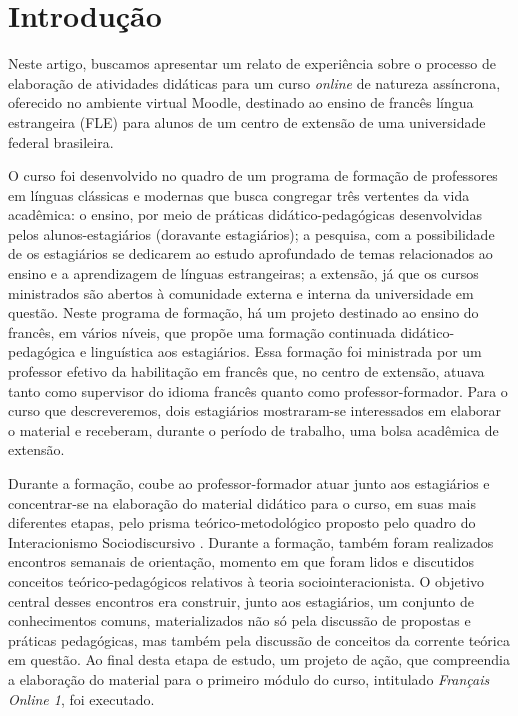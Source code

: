 \section{Introdução}\label{sec-introdução}

Neste artigo, buscamos apresentar um relato de experiência sobre o
processo de elaboração de atividades didáticas para um curso
\emph{online} de natureza assíncrona, oferecido no ambiente
virtual Moodle, destinado ao ensino de francês língua estrangeira (FLE)
para alunos de um centro de extensão de uma universidade federal
brasileira.

O curso foi desenvolvido no quadro de um programa de formação de
professores em línguas clássicas e modernas que busca congregar três
vertentes da vida acadêmica: o ensino, por meio de práticas
didático-pedagógicas desenvolvidas pelos alunos-estagiários (doravante
estagiários); a pesquisa, com a possibilidade de os estagiários se
dedicarem ao estudo aprofundado de temas relacionados ao ensino e a
aprendizagem de línguas estrangeiras; a extensão, já que os cursos
ministrados são abertos à comunidade externa e interna da universidade
em questão. Neste programa de formação, há um projeto destinado ao
ensino do francês, em vários níveis, que propõe uma formação continuada
didático-pedagógica e linguística aos estagiários. Essa formação foi
ministrada por um professor efetivo da habilitação em francês que, no
centro de extensão, atuava tanto como supervisor do idioma francês
quanto como professor-formador. Para o curso que descreveremos, dois
estagiários mostraram-se interessados em elaborar o material e
receberam, durante o período de trabalho, uma bolsa acadêmica de
extensão.

Durante a formação, coube ao professor-formador atuar junto aos
estagiários e concentrar-se na elaboração do material didático para o
curso, em suas mais diferentes etapas, pelo prisma teórico-metodológico
proposto pelo quadro do Interacionismo Sociodiscursivo \cite{bronckart_atividade_1999,bronckart_teorias_2021,schneuwly_generos_2004,graca_da_2023,tocaia_leitura_2019,tocaia_letramento_2022}. Durante a formação, também foram realizados encontros semanais de orientação, momento em que foram
lidos e discutidos conceitos teórico-pedagógicos relativos à teoria
sociointeracionista. O objetivo central desses encontros era construir,
junto aos estagiários, um conjunto de conhecimentos comuns,
materializados não só pela discussão de propostas e práticas
pedagógicas, mas também pela discussão de conceitos da corrente teórica
em questão. Ao final desta etapa de estudo, um projeto de ação, que
compreendia a elaboração do material para o primeiro módulo do curso,
intitulado \emph{Français Online 1}, foi executado.

